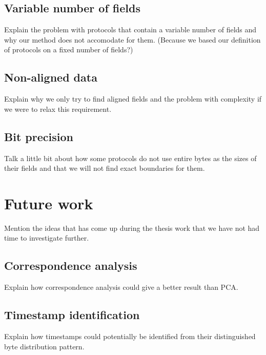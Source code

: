 \documentclass[a4paper]{report}
\begin{document}
\subsection{Variable number of fields}
Explain the problem with protocols that contain a variable number of fields and
why our method does not accomodate for them. (Because we based our definition
of protocols on a fixed number of fields?)

\subsection{Non-aligned data}
Explain why we only try to find aligned fields and the problem with complexity
if we were to relax this requirement.

\subsection{Bit precision}
Talk a little bit about how some protocols do not use entire bytes as the sizes
of their fields and that we will not find exact boundaries for them.

\section{Future work}
Mention the ideas that has come up during the thesis work that we have not had
time to investigate further.

\subsection{Correspondence analysis}
Explain how correspondence analysis could give a better result than PCA.

\subsection{Timestamp identification}
Explain how timestamps could potentially be identified from their distinguished
byte distribution pattern.



\end{document}
